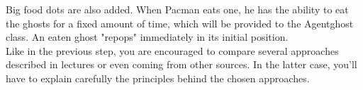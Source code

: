 \documentclass[12pt,a4paper,BCOR12mm, headexclude, footexclude, twoside, openright]{scrartcl}
\numberwithin{equation}{section} %
\numberwithin{figure}{section} %
\numberwithin{table}{section} %
\begin{document}
Big food dots are also added. When Pacman eats one, he has the ability to eat the ghosts for a fixed amount of time, which will be provided to the Agentghost class. An eaten ghost "repops" immediately in its initial position.\\

Like in the previous step, you are encouraged to compare several approaches described in lectures or even coming from other sources. In the latter case, you'll have to explain carefully the principles behind the chosen approaches.
\end{document}

